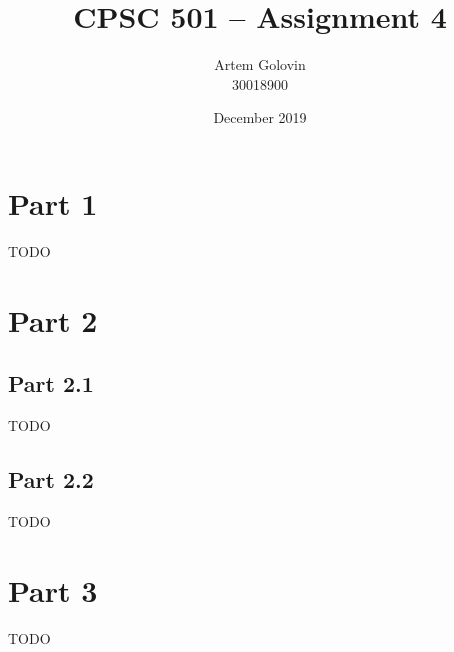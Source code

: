 \documentclass{article}
\title{CPSC 501 -- Assignment 4}
\author{Artem Golovin \\ 30018900}
\date{December 2019}
\begin{document}
\maketitle

\section*{Part 1}

TODO

\section*{Part 2}

\subsection*{Part 2.1}

TODO

\subsection*{Part 2.2}

TODO

\section*{Part 3}

TODO
\end{document}
